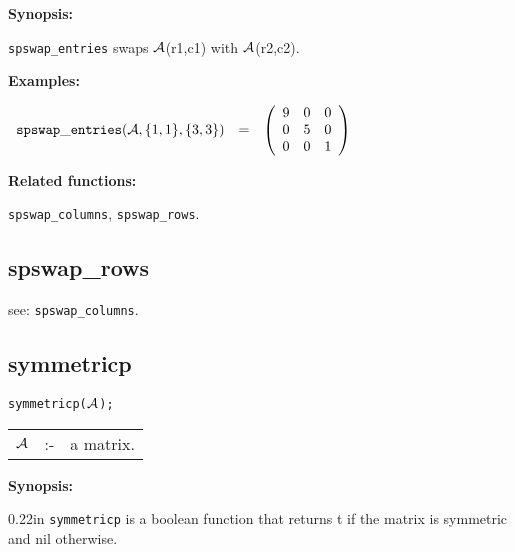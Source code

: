{\bf Synopsis:} 

\hspace*{0.175in} {\tt spswap\_entries} swaps ${\cal A}$(r1,c1) with 
                ${\cal A}$(r2,c2).

{\bf Examples:}

\begin{flushleft}  
\hspace*{0.1in}
\begin{math}  
\begin{array}{ccc}
{\tt spswap\_entries}({\cal A},\{1,1\},\{3,3\}) & = & 
        \left( \begin{array}{ccc} 9 & 0 & 0 \\ 0 & 5 & 0 \\ 0 & 0 & 1
 \end{array} \right) 
\end{array}
\end{math}  
\end{flushleft}

{\bf Related functions:}

\hspace*{0.175in} {\tt spswap\_columns}, {\tt spswap\_rows}.


\subsection{spswap\_rows}

\hspace*{0.175in} see: {\tt spswap\_columns}.


\subsection{symmetricp}


\hspace*{0.175in} {\tt symmetricp(${\cal A}$);}

\hspace*{0.1in}  
\begin{tabular}{l l l} 
${\cal A}$ &:-& a matrix. 
\end{tabular}

{\bf Synopsis:} %

\begin{addtolength}{\leftskip}{0.22in}
{\tt symmetricp} is a boolean function that returns t if the 
                matrix is symmetric and nil otherwise.

\end{addtolength}


